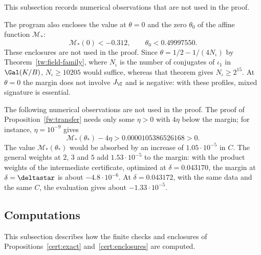 This subsection records numerical observations that are not used in the
proof.

\begin{remark}\label{cert:signature-remark}
The program also encloses the value at $\theta=0$ and the zero $\theta_0$
of the affine function $\mathcal M_*$:
\[
 \mathcal M_*(0)<-0.312,\qquad \theta_0<0.49997550 .
\]
These enclosures are not used in the proof. Since $\theta=1/2-1/(4N_\iota)$
by Theorem~\ref{tw:field-family}, where $N_\iota$ is the number of conjugates
of $\iota_1$ in $\Gal(K/B)$, $N_\iota\ge10205$ would suffice, whereas that
theorem gives $N_\iota\ge2^{15}$. At $\theta=0$ the margin does not involve
$J_\C$ and is negative: with these profiles, mixed signature is essential.
\end{remark}

\begin{remark}\label{cert:observations}
The following numerical observations are not used in the proof. The proof of
Proposition~\ref{fw:transfer} needs only some $\eta>0$ with $4\eta$ below the
margin; for instance, $\eta=10^{-9}$ gives
\begin{equation}\label{cert:final-margin}
 \mathcal M_*(\theta_*)-4\eta>0.0000105386526168>0 .
\end{equation}
The value $\mathcal M_*(\theta_*)$ would be absorbed by an increase of
$1.05\cdot10^{-5}$ in $C$. The general weights at $2$, $3$ and $5$ add
$1.53\cdot10^{-5}$ to the margin: with the product weights of the
intermediate certificate, optimized at $\delta=0.043170$, the margin at
$\delta=\deltastar$ is about $-4.8\cdot10^{-6}$. At $\delta=0.043172$, with the
same data and the same $C$, the evaluation gives about $-1.33\cdot10^{-5}$.
\end{remark}

\subsection{Computations}\label{cert:computations}
This subsection describes how the finite checks and enclosures of
Propositions~\ref{cert:exact} and~\ref{cert:enclosures} are computed.

